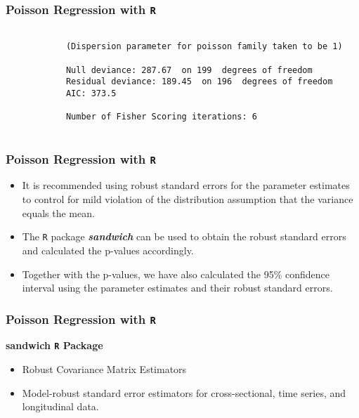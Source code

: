 \documentclass[00-GLMregslides.tex]{subfiles}
\begin{document}
	\begin{frame}[fragile]
		
		\frametitle{Poisson Regression with \texttt{R}}
		\large
		\begin{framed}
			\begin{verbatim}
			
			(Dispersion parameter for poisson family taken to be 1)
			
			Null deviance: 287.67  on 199  degrees of freedom
			Residual deviance: 189.45  on 196  degrees of freedom
			AIC: 373.5
			
			Number of Fisher Scoring iterations: 6
			
			\end{verbatim}
		\end{framed}
	\end{frame}
	
	\begin{frame}[fragile]
		
		\frametitle{Poisson Regression with \texttt{R}}
		\Large 
		\begin{itemize}
			\item It is recommended using robust standard errors for the parameter estimates to control for mild violation of the distribution assumption that the variance equals the mean. 
			\item The \texttt{R} package \textbf{\textit{sandwich}} can be used to obtain the robust standard errors and calculated the p-values accordingly. 
			\item Together with the p-values, we have also calculated the 95\% confidence interval using the parameter estimates and their robust standard errors. 
		\end{itemize}
	\end{frame}
	
	\begin{frame}[fragile]
		
		\frametitle{Poisson Regression with \texttt{R}}
		\large
		\textbf{sandwich \texttt{R} Package }
		\begin{itemize}
			\item Robust Covariance Matrix Estimators
			
			\item Model-robust standard error estimators for cross-sectional, time series, and longitudinal data.
			
		\end{itemize}
	\end{frame}
	
\end{document}
